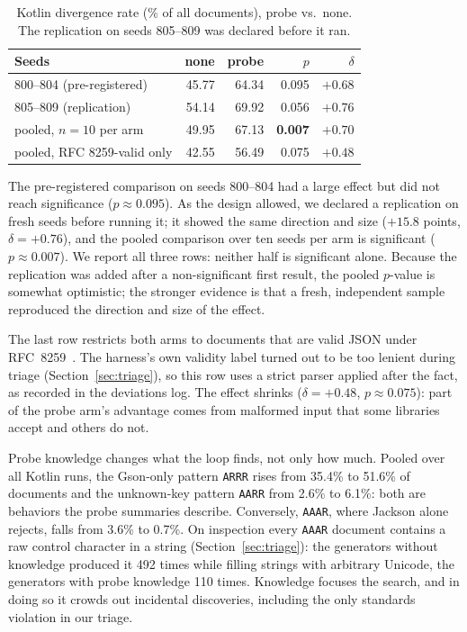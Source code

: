 \begin{table}[t]
\centering
\caption{Kotlin divergence rate (\% of all documents), probe vs.\ none.
The replication on seeds 805--809 was declared before it ran.}
\label{tab:kotlin}
\begin{tabular}{lrrrr}
\toprule
Seeds & none & probe & $p$ & $\delta$ \\
\midrule
800--804 (pre-registered) & 45.77 & 64.34 & 0.095 & $+0.68$ \\
805--809 (replication)    & 54.14 & 69.92 & 0.056 & $+0.76$ \\
pooled, $n{=}10$ per arm  & 49.95 & 67.13 & \textbf{0.007} & $+0.70$ \\
\midrule
pooled, RFC 8259-valid only & 42.55 & 56.49 & 0.075 & $+0.48$ \\
\bottomrule
\end{tabular}
\end{table}

The pre-registered comparison on seeds 800--804 had a large effect but did
not reach significance ($p \approx 0.095$). As the design allowed, we
declared a replication on fresh seeds before running it; it showed the same
direction and size ($+15.8$ points, $\delta = +0.76$), and the pooled
comparison over ten seeds per arm is significant ($p \approx 0.007$). We
report all three rows: neither half is significant alone. Because the
replication was added after a non-significant first result, the pooled
$p$-value is somewhat optimistic; the stronger evidence is that a fresh,
independent sample reproduced the direction and size of the effect.

The last row restricts both arms to documents that are valid JSON under
RFC~8259~\cite{rfc8259}. The harness's own validity label turned out to be
too lenient during triage (Section~\ref{sec:triage}), so this row uses a
strict parser applied after the fact, as recorded in the deviations log.
The effect shrinks ($\delta = +0.48$, $p \approx 0.075$): part of the
probe arm's advantage comes from malformed input that some libraries accept
and others do not.

Probe knowledge changes what the loop finds, not only how much. Pooled over
all Kotlin runs, the Gson-only pattern \texttt{ARRR} rises from 35.4\% to
51.6\% of documents and the unknown-key pattern \texttt{AARR} from 2.6\%
to 6.1\%: both are behaviors the probe summaries describe. Conversely,
\texttt{AAAR}, where Jackson alone rejects, falls from 3.6\% to 0.7\%. On
inspection every \texttt{AAAR} document contains a raw control character
in a string (Section~\ref{sec:triage}): the generators without knowledge
produced it 492 times while filling strings with arbitrary Unicode, the
generators with probe knowledge 110 times. Knowledge focuses the search,
and in doing so it crowds out incidental discoveries, including the only
standards violation in our triage.

